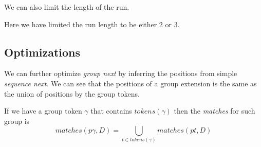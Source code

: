 \begin{figure}[H]
	
\end{figure}

We can also limit the length of the run.

\begin{figure}[H]
	
\end{figure}

Here we have limited the run length to be either 2 or 3.

\subsection{Optimizations}

We can further optimize \emph{group next} by inferring the positions from 
simple \emph{sequence next}. We can see that the positions of a group 
extension is the same as the union of positions by the group tokens.

If we have a group token $\gamma$ that contains $tokens(\gamma)$ then 
the \emph{matches} for such group is $$matches(p\gamma, D) = \bigcup_{t \in tokens(\gamma)} matches(pt, D) $$